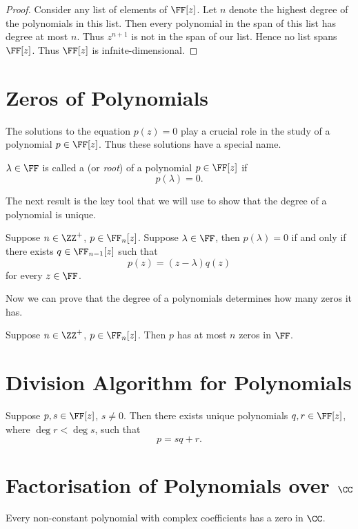 \begin{proof}
Consider any list of elements of $\FF[z]$. Let $n$ denote the highest degree of the polynomials in this list. Then every polynomial in the span of this list has degree at most $n$. Thus $z^{n+1}$ is not in the span of our list. Hence no list spans $\FF[z]$. Thus $\FF[z]$ is infnite-dimensional.
\end{proof}

\section{Zeros of Polynomials}
The solutions to the equation $p(z)=0$ play a crucial role in the study of a polynomial $p\in\FF[z]$. Thus these solutions have a special name.

\begin{definition}[Zero]
$\lambda\in\FF$ is called a  (or \emph{root}) of a polynomial $p\in\FF[z]$ if
\[p(\lambda)=0.\]
\end{definition}

The next result is the key tool that we will use to show that the degree of a polynomial is unique.

\begin{lemma}
Suppose $n\in\ZZ^+$, $p\in\FF_n[z]$. Suppose $\lambda\in\FF$, then $p(\lambda)=0$ if and only if there exists $q\in\FF_{n-1}[z]$ such that
\[p(z)=(z-\lambda)q(z)\]
for every $z\in\FF$.
\end{lemma}

Now we can prove that the degree of a polynomials determines how many zeros it has.

\begin{proposition}
Suppose $n\in\ZZ^+$, $p\in\FF_n[z]$. Then $p$ has at most $n$ zeros in $\FF$.
\end{proposition}

\section{Division Algorithm for Polynomials}
\begin{proposition}
Suppose $p,s\in\FF[z]$, $s\neq0$. Then there exists unique polynomials $q,r\in\FF[z]$, where $\deg r<\deg s$, such that
\[p=sq+r.\]
\end{proposition}

\section{Factorisation of Polynomials over $\CC$}
\begin{theorem}
Every non-constant polynomial with complex coefficients has a zero in $\CC$.
\end{theorem}

